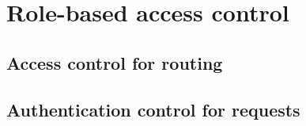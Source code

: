 \section{Role-based access control}

\subsection{Access control for routing}

\subsection{Authentication control for requests}

